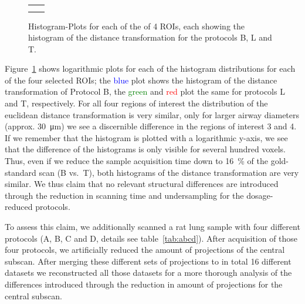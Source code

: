 \renewcommand{\imsize}{.309\columnwidth}
\begin{figure}
	\centering
	\caption{Histogram-Plots for each of the of 4 ROIs, each showing the histogram of the distance transformation for the protocols B, L and T.}%
	\ifiucr
		\begin{tabular}{cc}
			&%
			\\%
			&%
		\end{tabular}
	\else
	\fi	
	\label{fig:DTFplots}
\end{figure}

Figure~\ref{fig:DTFplots} shows logarithmic plots for each of the histogram distributions for each of the four selected ROIs; the \textcolor{blue}{blue} plot shows the histogram of the distance transformation of Protocol B, the \textcolor{green}{green} and \textcolor{red}{red} plot the same for protocols L and T, respectively. For all four regions of interest the distribution of the euclidean distance transformation is very similar, only for larger airway diameters (approx. \SI{30}{\micro\meter}) we see a discernible difference in the regions of interest 3 and 4. If we remember that the histogram is plotted with a logarithmic y-axis, we see that the difference of the histograms is only visible for several hundred voxels. Thus, even if we reduce the sample acquisition time down to \SI{16}{\percent} of the gold-standard scan (B vs.\ T), both histograms of the distance transformation are very similar. We thus claim that no relevant structural differences are introduced through the reduction in scanning time and undersampling for the dosage-reduced protocols.

To assess this claim, we additionally scanned a rat lung sample with four different protocols (A, B, C and D, details see table~\ref{tab:abcd}). After acquisition of those four protocols, we artificially reduced the amount of projections of the central subscan. After merging these different sets of projections to in total 16 different datasets we reconstructed all those datasets for a more thorough analysis of the differences introduced through the reduction in amount of projections for the central subscan.

